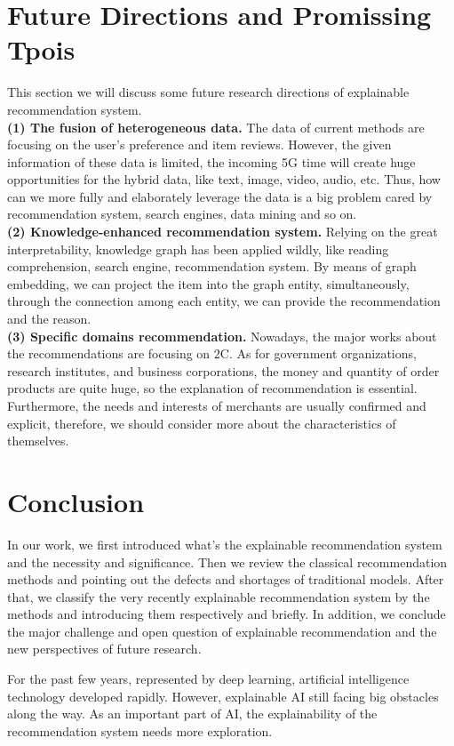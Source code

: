 \documentclass[10pt,twocolumn,letterpaper]{article}
\begin{document}
\section{Future Directions and Promissing Tpois}
This section we will discuss some future research directions of explainable recommendation system.\\
{\bf (1) The fusion of heterogeneous data.} The data of current methods are focusing on the user's preference and item reviews. However, the given information of these data is limited, the incoming 5G time will create huge opportunities for the hybrid data, like text, image, video, audio, etc. Thus, how can we more fully and elaborately leverage the data is a big problem cared by recommendation system, search engines, data mining and so on.\\ 
{\bf (2) Knowledge-enhanced recommendation system.} Relying on the great interpretability, knowledge graph has been applied wildly, like reading comprehension, search engine, recommendation system. By means of graph embedding, we can project the item into the graph entity, simultaneously, through the connection among each entity, we can provide the recommendation and the reason.\\   
{\bf (3) Specific domains recommendation.} Nowadays, the major works about the recommendations are focusing on 2C. As for government organizations, research institutes, and business corporations, the money and quantity of order products are quite huge, so the explanation of recommendation is essential. Furthermore, the needs and interests of merchants are usually confirmed and explicit, therefore, we should consider more about the characteristics of themselves.   

\section{Conclusion}
In our work, we first introduced what's the explainable recommendation system and the necessity and significance. Then we review the classical recommendation methods and pointing out the defects and shortages of traditional models. After that, we classify the very recently explainable recommendation system by the methods and introducing them respectively and briefly. In addition, we conclude the major challenge and open question of explainable recommendation and the new perspectives of future research. 

For the past few years, represented by deep learning, artificial intelligence technology developed rapidly. However, explainable AI still facing big obstacles along the way. As an important part of AI, the explainability of the recommendation system needs more exploration.


{\small


}
\end{document}
